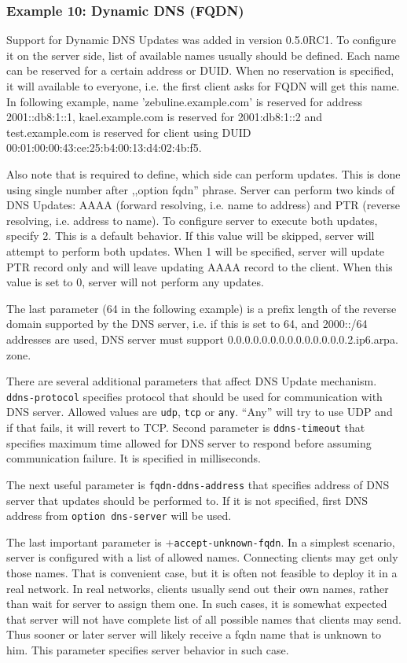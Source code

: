 \subsubsection{Example 10: Dynamic DNS (FQDN)}
\label{example-server-fqdn}

Support for Dynamic DNS Updates was added in version 0.5.0RC1. To
configure it on the server side, list of available names usually
should be defined. Each name can be reserved for a certain address or
DUID. When no reservation is specified, it will available to everyone,
i.e. the first client asks for FQDN will get this name. In following
example, name 'zebuline.example.com' is reserved for address 2001::db8:1::1,
kael.example.com is reserved for 2001:db8:1::2 and test.example.com is
reserved for client using DUID
00:01:00:00:43:ce:25:b4:00:13:d4:02:4b:f5.

Also note that is required to define, which side can perform updates.
This is done using single number after ,,option fqdn'' phrase. Server
can perform two kinds of DNS Updates: AAAA (forward resolving,
i.e. name to address) and PTR (reverse resolving, i.e. address to
name). To configure server to execute both updates, specify 2. This is
a default behavior. If this value will be skipped, server will attempt
to perform both updates. When 1 will be specified, server will update
PTR record only and will leave updating AAAA record to the
client. When this value is set to 0, server will not perform any
updates.

The last parameter (64 in the following example) is a prefix length of
the reverse domain supported by the DNS server, i.e. if this is set to
64, and 2000::/64 addresses are used, DNS server must support
0.0.0.0.0.0.0.0.0.0.0.0.0.0.2.ip6.arpa. zone.

There are several additional parameters that affect DNS Update
mechanism. \verb+ddns-protocol+ specifies protocol that should be used
for communication with DNS server.  Allowed values
are \verb+udp+, \verb+tcp+ or \verb+any+. ``Any'' will try to use UDP
and if that fails, it will revert to TCP. Second parameter
is \verb+ddns-timeout+ that specifies maximum time allowed for DNS
server to respond before assuming communication failure. It is
specified in milliseconds.

The next useful parameter is \verb+fqdn-ddns-address+ that specifies
address of DNS server that updates should be performed to. If it is
not specified, first DNS address from \verb+option dns-server+ will be
used.

The last important parameter is +\verb+accept-unknown-fqdn+. In a
simplest scenario, server is configured with a list of allowed
names. Connecting clients may get only those names. That is convenient
case, but it is often not feasible to deploy it in a real network.  In
real networks, clients usually send out their own names, rather than
wait for server to assign them one. In such cases, it is somewhat
expected that server will not have complete list of all possible names
that clients may send. Thus sooner or later server will likely receive
a fqdn name that is unknown to him. This parameter specifies server
behavior in such case.

